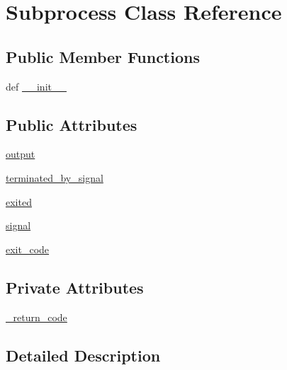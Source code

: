 \hypertarget{classgtest__test__utils_1_1Subprocess}{\section{\-Subprocess \-Class \-Reference}
\label{d0/d1b/classgtest__test__utils_1_1Subprocess}
}
\subsection*{\-Public \-Member \-Functions}
\begin{DoxyCompactItemize}
\item 
def \hyperlink{classgtest__test__utils_1_1Subprocess_ac775ee34451fdfa742b318538164070e}{\-\_\-\-\_\-init\-\_\-\-\_\-}
\end{DoxyCompactItemize}
\subsection*{\-Public \-Attributes}
\begin{DoxyCompactItemize}
\item 
\hyperlink{classgtest__test__utils_1_1Subprocess_ad288825273ed7192429ab0474fb2d4a0}{output}
\item 
\hyperlink{classgtest__test__utils_1_1Subprocess_aaafeb0a064cb5b92ad449517611ca978}{terminated\-\_\-by\-\_\-signal}
\item 
\hyperlink{classgtest__test__utils_1_1Subprocess_a46a009bc3d81c111f8dac51738168bbe}{exited}
\item 
\hyperlink{classgtest__test__utils_1_1Subprocess_af5deff54993bb606e67a06d443d3f0cd}{signal}
\item 
\hyperlink{classgtest__test__utils_1_1Subprocess_ab45d8ea6639edac36ac747cbf562be9a}{exit\-\_\-code}
\end{DoxyCompactItemize}
\subsection*{\-Private \-Attributes}
\begin{DoxyCompactItemize}
\item 
\hyperlink{classgtest__test__utils_1_1Subprocess_aae387b0ebf30b42cfeceddf86301a31e}{\-\_\-return\-\_\-code}
\end{DoxyCompactItemize}


\subsection{\-Detailed \-Description}


